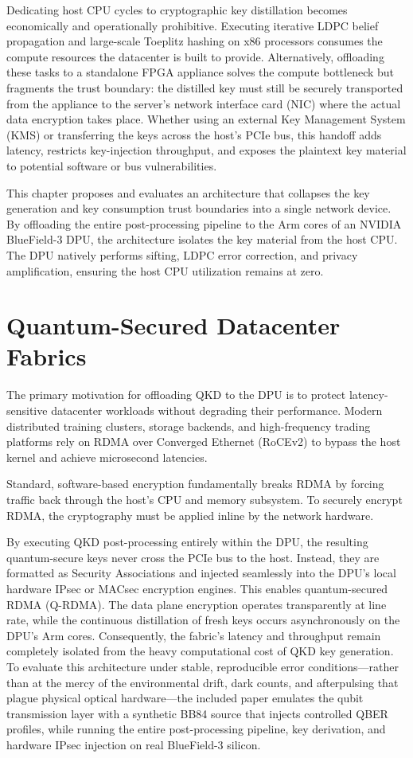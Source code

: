 Dedicating host CPU cycles to cryptographic key distillation becomes economically and operationally prohibitive. Executing iterative LDPC belief propagation and large-scale Toeplitz hashing on x86 processors consumes the compute resources the datacenter is built to provide. Alternatively, offloading these tasks to a standalone FPGA appliance solves the compute bottleneck but fragments the trust boundary: the distilled key must still be securely transported from the appliance to the server's network interface card (NIC) where the actual data encryption takes place. Whether using an external Key Management System (KMS) or transferring the keys across the host's PCIe bus, this handoff adds latency, restricts key-injection throughput, and exposes the plaintext key material to potential software or bus vulnerabilities.

This chapter proposes and evaluates an architecture that collapses the key generation and key consumption trust boundaries into a single network device. By offloading the entire post-processing pipeline to the Arm cores of an NVIDIA BlueField-3 DPU, the architecture isolates the key material from the host CPU. The DPU natively performs sifting, LDPC error correction, and privacy amplification, ensuring the host CPU utilization remains at zero.

\section{Quantum-Secured Datacenter Fabrics}
\label{sec:qkd-dpu-rdma}

The primary motivation for offloading QKD to the DPU is to protect latency-sensitive datacenter workloads without degrading their performance. Modern distributed training clusters, storage backends, and high-frequency trading platforms rely on RDMA over Converged Ethernet (RoCEv2) to bypass the host kernel and achieve microsecond latencies.

Standard, software-based encryption fundamentally breaks RDMA by forcing traffic back through the host's CPU and memory subsystem. To securely encrypt RDMA, the cryptography must be applied inline by the network hardware.

By executing QKD post-processing entirely within the DPU, the resulting quantum-secure keys never cross the PCIe bus to the host. Instead, they are formatted as Security Associations and injected seamlessly into the DPU's local hardware IPsec or MACsec encryption engines. This enables quantum-secured RDMA (Q-RDMA). The data plane encryption operates transparently at line rate, while the continuous distillation of fresh keys occurs asynchronously on the DPU's Arm cores. Consequently, the fabric's latency and throughput remain completely isolated from the heavy computational cost of QKD key generation. To evaluate this architecture under stable, reproducible error conditions---rather than at the mercy of the environmental drift, dark counts, and afterpulsing that plague physical optical hardware---the included paper emulates the qubit transmission layer with a synthetic BB84 source that injects controlled QBER profiles, while running the entire post-processing pipeline, key derivation, and hardware IPsec injection on real BlueField-3 silicon.

